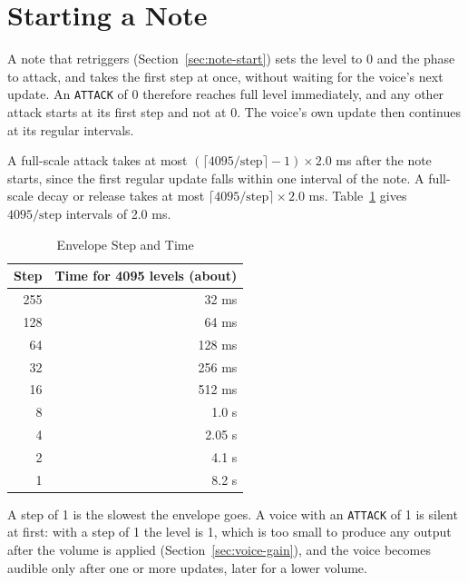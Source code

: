 \section{Starting a Note}

A note that retriggers (Section~\ref{sec:note-start}) sets the level to 0 and the phase to attack, and takes the first
step at once, without waiting for the voice's next update. An \texttt{ATTACK} of 0 therefore reaches full level
immediately, and any other attack starts at its first step and not at 0. The voice's own update then continues at its
regular intervals.

A full-scale attack takes at most $(\lceil 4095 / \mathrm{step} \rceil - 1) \times 2.0$ ms after the note starts, since
the first regular update falls within one interval of the note. A full-scale decay or release takes at most $\lceil
	4095 / \mathrm{step} \rceil \times 2.0$ ms. Table~\ref{tab:envelope-times} gives $4095 / \mathrm{step}$ intervals of
2.0 ms.

\begin{table}[H]
	\centering
	\begin{tabular}{rr}
		\toprule
		\textbf{Step} & \textbf{Time for 4095 levels (about)} \\
		\midrule
		255           & 32 ms                                 \\
		128           & 64 ms                                 \\
		64            & 128 ms                                \\
		32            & 256 ms                                \\
		16            & 512 ms                                \\
		8             & 1.0 s                                 \\
		4             & 2.05 s                                \\
		2             & 4.1 s                                 \\
		1             & 8.2 s                                 \\
		\bottomrule
	\end{tabular}
	\caption{Envelope Step and Time}
	\label{tab:envelope-times}
\end{table}

A step of 1 is the slowest the envelope goes. A voice with an \texttt{ATTACK} of 1 is silent at first: with a step of 1
the level is 1, which is too small to produce any output after the volume is applied (Section~\ref{sec:voice-gain}),
and the voice becomes audible only after one or more updates, later for a lower volume.

